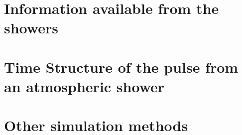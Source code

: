 \section{Information available from the showers}

\section{Time Structure of the \Cherenkov pulse from an atmospheric shower}

\section{Other simulation methods}
\label{sec:simothers}

\endinput
%

